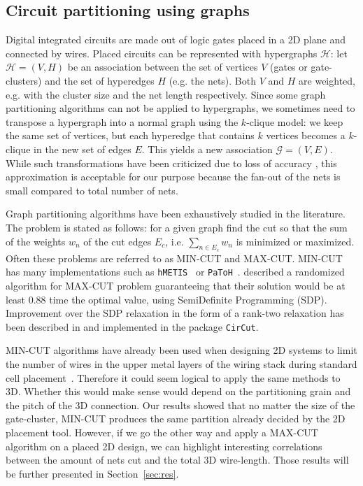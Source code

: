 \documentclass[conference]{IEEEtran}
\begin{document}
\subsection{Circuit partitioning using graphs}\label{sec:partitioning}
Digital integrated circuits are made out of logic gates placed in a 2D plane and connected by wires. Placed circuits can be represented with hypergraphs $\mathcal{H}$: let $\mathcal{H} = (V, H)$ be an association between the set of vertices $V$ (gates or gate-clusters) and the set of hyperedges $H$ (e.g. the nets). Both $V$ and $H$ are weighted, e.g. with the cluster size and the net length respectively. Since some graph partitioning algorithms can not be applied to hypergraphs, we sometimes need to transpose a hypergraph into a normal graph using the $k$-clique model: we keep the same set of vertices, but each hyperedge that contains $k$ vertices becomes a $k$-clique in the new set of edges $E$. This yields a new association $\mathcal{G} = (V, E)$. While such transformations have been criticized  due to loss of accuracy \cite{IhlerEdmund;WagnerDorothea;Wagner1993}, this approximation is acceptable for our purpose because the fan-out of the nets is small compared to total number of nets.

Graph partitioning algorithms have been exhaustively studied in the literature. The problem is stated as follows: for a given graph find the cut so that the sum of the weights $w_n$ of the cut edges $E_c$, i.e. $\sum_{n \in E_c} w_{n}$ is minimized or maximized. Often these problems are referred to as MIN-CUT and MAX-CUT. MIN-CUT has many implementations such as \texttt{hMETIS}~\cite{Karypis1999} or \texttt{PaToH}~\cite{Aykanat2011}. \cite{Goemans1995} described a randomized algorithm for MAX-CUT problem guaranteeing that their solution would be at least 0.88 time the optimal value, using SemiDefinite Programming (SDP). Improvement over the SDP relaxation in the form of a rank-two relaxation has been described in \cite{Burer2000} and implemented in the package \texttt{CirCut}.

MIN-CUT algorithms have already been used when designing 2D systems to limit the number of wires in the upper metal layers of the wiring stack during standard cell placement~\cite{KahngAndrewB.Lienig2011}. Therefore it could seem logical to apply the same methods to 3D. Whether this would make sense would depend on the partitioning grain and the pitch of the 3D connection. Our results showed that no matter the size of the gate-cluster, MIN-CUT produces the same partition already decided by the 2D placement tool. However, if we go the other way and apply a MAX-CUT algorithm on a placed 2D design, we can highlight interesting correlations between the amount of nets cut and the total 3D wire-length. Those results will be further presented in Section~\ref{sec:res}.
\end{document}

